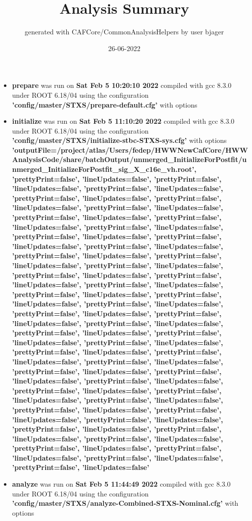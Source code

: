 \documentclass{article}
\title{Analysis Summary}
\author{generated with CAFCore/CommonAnalysisHelpers by user bjager}
\date{26-06-2022}
\begin{document}
\maketitle
\tableofcontents

\begin{itemize}
\item \textbf{prepare} was run on \textbf{Sat Feb  5 10:20:10 2022} compiled with gcc 8.3.0 under ROOT 6.18/04 using the configuration \textbf{'config/master/STXS/prepare-default.cfg'} with options \textbf{} \item \textbf{initialize} was run on \textbf{Sat Feb  5 11:10:20 2022} compiled with gcc 8.3.0 under ROOT 6.18/04 using the configuration \textbf{'config/master/STXS/initialize-stbc-STXS-sys.cfg'} with options \textbf{'outputFile=/project/atlas/Users/fedep/HWWNewCafCore/HWWAnalysisCode/share/batchOutput/unmerged\_InitializeForPostfit/unmerged\_InitializeForPostfit\_sig\_X\_c16e\_vh.root', 'prettyPrint=false', 'lineUpdates=false', 'prettyPrint=false', 'lineUpdates=false', 'prettyPrint=false', 'lineUpdates=false', 'prettyPrint=false', 'lineUpdates=false', 'prettyPrint=false', 'lineUpdates=false', 'prettyPrint=false', 'lineUpdates=false', 'prettyPrint=false', 'lineUpdates=false', 'prettyPrint=false', 'lineUpdates=false', 'prettyPrint=false', 'lineUpdates=false', 'prettyPrint=false', 'lineUpdates=false', 'prettyPrint=false', 'lineUpdates=false', 'prettyPrint=false', 'lineUpdates=false', 'prettyPrint=false', 'lineUpdates=false', 'prettyPrint=false', 'lineUpdates=false', 'prettyPrint=false', 'lineUpdates=false', 'prettyPrint=false', 'lineUpdates=false', 'prettyPrint=false', 'lineUpdates=false', 'prettyPrint=false', 'lineUpdates=false', 'prettyPrint=false', 'lineUpdates=false', 'prettyPrint=false', 'lineUpdates=false', 'prettyPrint=false', 'lineUpdates=false', 'prettyPrint=false', 'lineUpdates=false', 'prettyPrint=false', 'lineUpdates=false', 'prettyPrint=false', 'lineUpdates=false', 'prettyPrint=false', 'lineUpdates=false', 'prettyPrint=false', 'lineUpdates=false', 'prettyPrint=false', 'lineUpdates=false', 'prettyPrint=false', 'lineUpdates=false', 'prettyPrint=false', 'lineUpdates=false', 'prettyPrint=false', 'lineUpdates=false', 'prettyPrint=false', 'lineUpdates=false', 'prettyPrint=false', 'lineUpdates=false', 'prettyPrint=false', 'lineUpdates=false', 'prettyPrint=false', 'lineUpdates=false', 'prettyPrint=false', 'lineUpdates=false', 'prettyPrint=false', 'lineUpdates=false', 'prettyPrint=false', 'lineUpdates=false', 'prettyPrint=false', 'lineUpdates=false', 'prettyPrint=false', 'lineUpdates=false', 'prettyPrint=false', 'lineUpdates=false', 'prettyPrint=false', 'lineUpdates=false', 'prettyPrint=false', 'lineUpdates=false', 'prettyPrint=false', 'lineUpdates=false', 'prettyPrint=false', 'lineUpdates=false', 'prettyPrint=false', 'lineUpdates=false', 'prettyPrint=false', 'lineUpdates=false'} \item \textbf{analyze} was run on \textbf{Sat Feb  5 11:44:49 2022} compiled with gcc 8.3.0 under ROOT 6.18/04 using the configuration \textbf{'config/master/STXS/analyze-Combined-STXS-Nominal.cfg'} with options 
\end{itemize}
\end{document}
